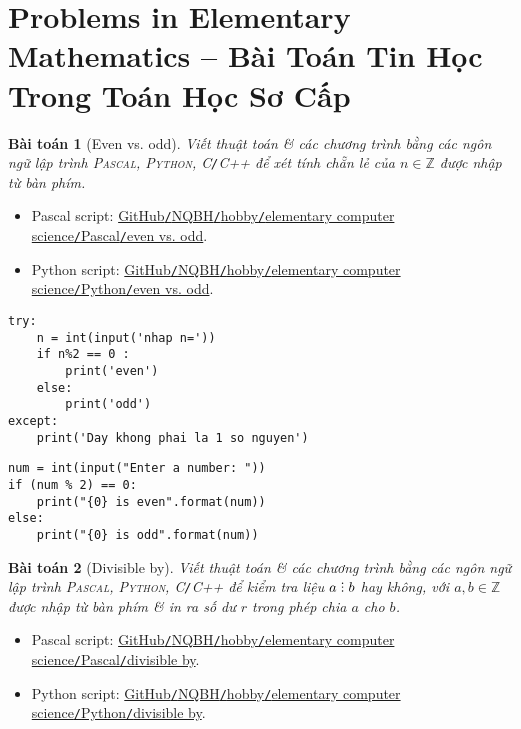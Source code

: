 \documentclass{article}
\newtheorem{baitoan}{Bài toán}
\DeclareRobustCommand{\divby}{%
	\mathrel{\vbox{\baselineskip.65ex\lineskiplimit0pt\hbox{.}\hbox{.}\hbox{.}}}%
}
\begin{document}

\section{Problems in Elementary Mathematics  -- Bài Toán Tin Học Trong Toán Học Sơ Cấp}

\begin{baitoan}[Even vs. odd]
	Viết thuật toán \& các chương trình bằng các ngôn ngữ lập trình \textsc{Pascal, Python, C\texttt{/}C++} để xét tính chẵn lẻ của $n\in\mathbb{Z}$ được nhập từ bàn phím.
\end{baitoan}

\begin{itemize}
	\item Pascal script: \href{https://github.com/NQBH/hobby/blob/master/elementary_computer_science/Pascal/even_odd.pas}{GitHub\texttt{/}NQBH\texttt{/}hobby\texttt{/}elementary computer science\texttt{/}Pascal\texttt{/}even vs. odd}.
	\item Python script: \href{https://github.com/NQBH/hobby/blob/master/elementary_computer_science/Python/even_odd.py}{GitHub\texttt{/}NQBH\texttt{/}hobby\texttt{/}elementary computer science\texttt{/}Python\texttt{/}even vs. odd}.
\end{itemize}

\begin{multicols}{2}
    \begin{verbatim}
try:
    n = int(input('nhap n='))
    if n%2 == 0 :
        print('even')
    else:
        print('odd')
except:
    print('Day khong phai la 1 so nguyen')
    \end{verbatim}
    \columnbreak
    \begin{verbatim}
num = int(input("Enter a number: "))
if (num % 2) == 0:
    print("{0} is even".format(num))
else:
    print("{0} is odd".format(num))
    \end{verbatim}
\end{multicols}

\begin{baitoan}[Divisible by]
	Viết thuật toán \& các chương trình bằng các ngôn ngữ lập trình \textsc{Pascal, Python, C\texttt{/}C++} để kiểm tra liệu $a\divby b$ hay không, với $a,b\in\mathbb{Z}$ được nhập từ bàn phím \& in ra số dư $r$ trong phép chia $a$ cho $b$.
\end{baitoan}

\begin{itemize}
	\item Pascal script: \href{https://github.com/NQBH/hobby/blob/master/elementary_computer_science/Pascal/divisible_by.pas}{GitHub\texttt{/}NQBH\texttt{/}hobby\texttt{/}elementary computer science\texttt{/}Pascal\texttt{/}divisible by}.
	\item Python script: \href{https://github.com/NQBH/hobby/blob/master/elementary_computer_science/Python/divisible_by.py}{GitHub\texttt{/}NQBH\texttt{/}hobby\texttt{/}elementary computer science\texttt{/}Python\texttt{/}divisible by}.
\end{itemize}
\end{document}

